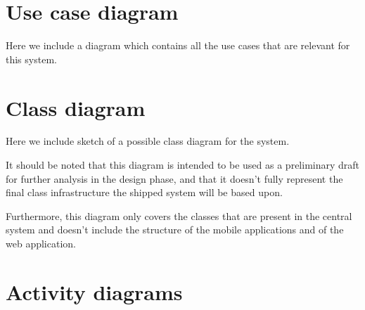 \section{Use case diagram}
Here we include a diagram which contains all the use cases that are relevant for this system.
\begin{landscape}

\end{landscape}


\section{Class diagram}
Here we include sketch of a possible class diagram for the system. 

It should be noted that this diagram is intended to be used as a preliminary draft for further analysis in the design phase, and that it doesn't fully represent the final class infrastructure the shipped system will be based upon.

Furthermore, this diagram only covers the classes that are present in the central system and doesn't include the structure of the mobile applications and of the web application.

\begin{landscape}
%

\end{landscape}


\section{Activity diagrams}
